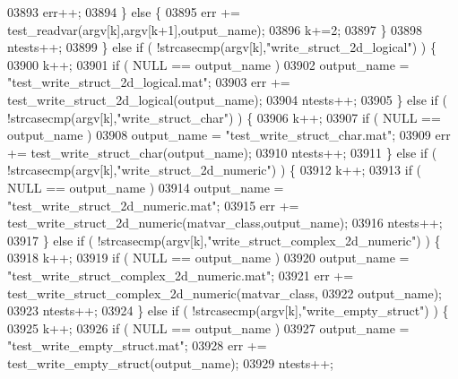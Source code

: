 \begin{DoxyCode}
{{{{{{{{{{{{{{{{{{{{{{{{{{{{{{{{{{{{{{{{{{{{{{{{{{{{{{{{{{{{{{{{{{{{03893                 err++;
03894             \} \textcolor{keywordflow}{else} \{
03895                 err += test\_readvar(argv[k],argv[k+1],output\_name);
03896                 k+=2;
03897             \}
03898             ntests++;
03899         \} \textcolor{keywordflow}{else} \textcolor{keywordflow}{if} ( !strcasecmp(argv[k],\textcolor{stringliteral}{"write\_struct\_2d\_logical"}) ) \{
03900             k++;
03901             \textcolor{keywordflow}{if} ( NULL == output\_name )
03902                 output\_name = \textcolor{stringliteral}{"test\_write\_struct\_2d\_logical.mat"};
03903             err += test\_write\_struct\_2d\_logical(output\_name);
03904             ntests++;
03905         \} \textcolor{keywordflow}{else} \textcolor{keywordflow}{if} ( !strcasecmp(argv[k],\textcolor{stringliteral}{"write\_struct\_char"}) ) \{
03906             k++;
03907             \textcolor{keywordflow}{if} ( NULL == output\_name )
03908                 output\_name = \textcolor{stringliteral}{"test\_write\_struct\_char.mat"};
03909             err += test\_write\_struct\_char(output\_name);
03910             ntests++;
03911         \} \textcolor{keywordflow}{else} \textcolor{keywordflow}{if} ( !strcasecmp(argv[k],\textcolor{stringliteral}{"write\_struct\_2d\_numeric"}) ) \{
03912             k++;
03913             \textcolor{keywordflow}{if} ( NULL == output\_name )
03914                 output\_name = \textcolor{stringliteral}{"test\_write\_struct\_2d\_numeric.mat"};
03915             err += test\_write\_struct\_2d\_numeric(matvar\_class,output\_name);
03916             ntests++;
03917         \} \textcolor{keywordflow}{else} \textcolor{keywordflow}{if} ( !strcasecmp(argv[k],\textcolor{stringliteral}{"write\_struct\_complex\_2d\_numeric"}) ) \{
03918             k++;
03919             \textcolor{keywordflow}{if} ( NULL == output\_name )
03920                 output\_name = \textcolor{stringliteral}{"test\_write\_struct\_complex\_2d\_numeric.mat"};
03921             err += test\_write\_struct\_complex\_2d\_numeric(matvar\_class,
03922                                                         output\_name);
03923             ntests++;
03924         \} \textcolor{keywordflow}{else} \textcolor{keywordflow}{if} ( !strcasecmp(argv[k],\textcolor{stringliteral}{"write\_empty\_struct"}) ) \{
03925             k++;
03926             \textcolor{keywordflow}{if} ( NULL == output\_name )
03927                 output\_name = \textcolor{stringliteral}{"test\_write\_empty\_struct.mat"};
03928             err += test\_write\_empty\_struct(output\_name);
03929             ntests++;
}}}}}}}}}}}}}}}}}}}}}}}}}}}}}}}}}}}}}}}}}}}}}}}}}}}}}}}}}}}}}}}}}}}}
\end{DoxyCode}
